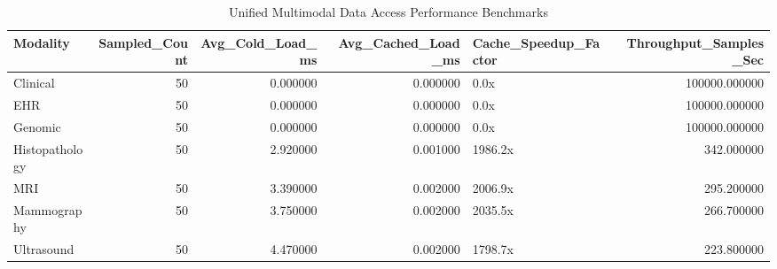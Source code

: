 \begin{table}
\caption{Unified Multimodal Data Access Performance Benchmarks}
\label{tab:table_loader_benchmarks}
\begin{tabular}{lrrrlr}
\toprule
Modality & Sampled\_Count & Avg\_Cold\_Load\_ms & Avg\_Cached\_Load\_ms & Cache\_Speedup\_Factor & Throughput\_Samples\_Sec \\
\midrule
Clinical & 50 & 0.000000 & 0.000000 & 0.0x & 100000.000000 \\
EHR & 50 & 0.000000 & 0.000000 & 0.0x & 100000.000000 \\
Genomic & 50 & 0.000000 & 0.000000 & 0.0x & 100000.000000 \\
Histopathology & 50 & 2.920000 & 0.001000 & 1986.2x & 342.000000 \\
MRI & 50 & 3.390000 & 0.002000 & 2006.9x & 295.200000 \\
Mammography & 50 & 3.750000 & 0.002000 & 2035.5x & 266.700000 \\
Ultrasound & 50 & 4.470000 & 0.002000 & 1798.7x & 223.800000 \\
\bottomrule
\end{tabular}
\end{table}
